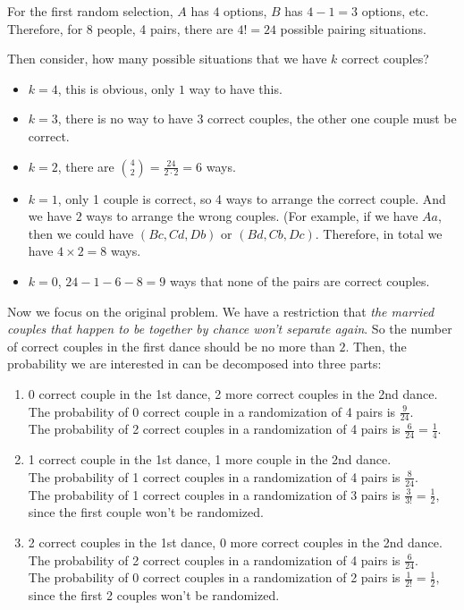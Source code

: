 \documentclass[a4paper, 11pt, twoside]{article}
\begin{document}
For the first random selection, $A$ has $4$ options, $B$ has $4-1=3$ options, etc. Therefore, for 8 people, 4 pairs, there are $4!=24$ possible pairing situations.

Then consider, how many possible situations that we have $k$ correct couples? 

\begin{itemize}
	\item $k=4$, this is obvious, only $1$ way to have this.
	\item $k=3$, there is no way to have $3$ correct couples, the other one couple must be correct.
	\item $k=2$, there are ${4 \choose 2}= \frac{24}{2\cdot 2} = 6$ ways.
	\item $k=1$, only 1 couple is correct, so 4 ways to arrange the correct couple. And we have $2$ ways to arrange the wrong couples. (For example, if we have $Aa$, then we could have $(Bc, Cd, Db)$ or $(Bd, Cb, Dc)$. Therefore, in total we have $4\times 2=8$ ways.
	\item $k=0$, $24-1-6-8=9$ ways that none of the pairs are correct couples.
\end{itemize}

Now we focus on the original problem. We have a restriction that \textit{the married couples that happen to be together by chance won't separate again}. So the number of correct couples in the first dance should be no more than $2$. Then, the probability we are interested in can be decomposed into three parts:

\begin{enumerate}
	\item 0 correct couple in the 1st dance, 2 more correct couples in the 2nd dance.\\
	The probability of 0 correct couple in a randomization of 4 pairs is $\frac{9}{24}$.\\
	The probability of 2 correct couples in a randomization of 4 pairs is $\frac{6}{24}=\frac{1}{4}.$
	\item 1 correct couple in the 1st dance, 1 more couple in the 2nd dance.\\
	The probability of 1 correct couples in a randomization of 4 pairs is $\frac{8}{24}.$\\
	The probability of 1 correct couples in a randomization of 3 pairs is $\frac{3}{3!}=\frac{1}{2},$ since the first couple won't be randomized. 
	\item 2 correct couples in the 1st dance, 0 more correct couples in the 2nd dance.\\
	The probability of 2 correct couples in a randomization of 4 pairs is $\frac{6}{24}$.\\
	The probability of 0 correct couples in a randomization of 2 pairs is $\frac{1}{2!}=\frac{1}{2},$ since the first 2 couples won't be randomized.
\end{enumerate}
\end{document}
